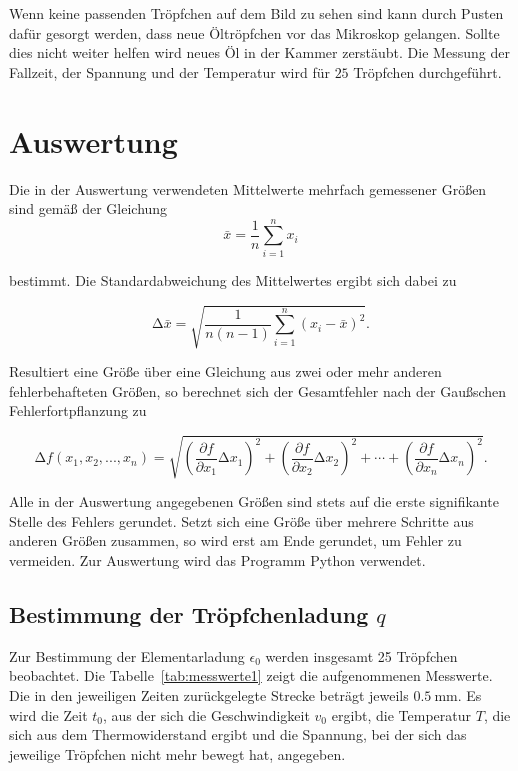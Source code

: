 \documentclass[
  bibliography=totoc,     %
  captions=tableheading,  %
  titlepage=firstiscover, %
]{scrartcl}
\begin{document}
\noindent
Wenn keine passenden Tröpfchen auf dem Bild zu sehen sind kann durch
Pusten dafür gesorgt werden, dass neue Öltröpfchen vor das Mikroskop
gelangen. Sollte dies nicht weiter helfen wird neues Öl in der Kammer
zerstäubt. Die Messung der Fallzeit, der Spannung und der Temperatur
wird für $25$ Tröpfchen durchgeführt.
\clearpage

\section{Auswertung}
\label{sec:auswertung}
Die in der Auswertung verwendeten Mittelwerte mehrfach gemessener Größen sind gemäß der
Gleichung
%
\begin{equation}
    \bar{x}=\frac{1}{n}\sum_{i=1}^n x_i
    \label{eq:mittelwert}
\end{equation}

bestimmt. Die Standardabweichung des Mittelwertes ergibt sich dabei zu

\begin{equation}
    \mathup{\Delta}\bar{x}=\sqrt{\frac{1}{n(n-1)}\sum_{i=1}^n\left(x_i-\bar{x}\right)^2}.
    \label{eq:standardabweichung}
\end{equation}

Resultiert eine Größe über eine Gleichung aus zwei oder mehr anderen fehlerbehafteten Größen, so
berechnet sich der Gesamtfehler nach der Gaußschen Fehlerfortpflanzung zu

\begin{equation}
    \mathup{\Delta}f(x_1,x_2,...,x_n)=\sqrt{\left(\frac{\partial f}{\partial x_1}\mathup{\Delta}x_1\right)^2+\left(\frac{\partial f}{\partial x_2}\mathup{\Delta}x_2\right)^2+ \dotsb +\left(\frac{\partial f}{\partial x_n}\mathup{\Delta}x_n\right)^2}.
    \label{eq:fehlerfortpflanzung}
\end{equation}

Alle in der Auswertung angegebenen Größen sind stets auf die erste signifikante Stelle des
Fehlers gerundet. Setzt sich eine Größe über mehrere Schritte aus anderen Größen zusammen,
so wird erst am Ende gerundet, um Fehler zu vermeiden. Zur Auswertung wird das Programm Python verwendet.
\subsection{Bestimmung der Tröpfchenladung \texorpdfstring{$q$}{q}}

Zur Bestimmung der Elementarladung $\epsilon_0$ werden insgesamt 25 Tröpfchen beobachtet. Die Tabelle~\ref{tab:messwerte1} zeigt die aufgenommenen Messwerte. Die in den jeweiligen Zeiten zurückgelegte Strecke beträgt jeweils $\SI{0.5}{\milli\metre}$. Es wird die Zeit $t_0$, aus der sich die Geschwindigkeit $v_0$ ergibt, die Temperatur $T$, die sich aus dem Thermowiderstand ergibt und die Spannung, bei der sich das jeweilige Tröpfchen nicht mehr bewegt hat, angegeben.
\end{document}
